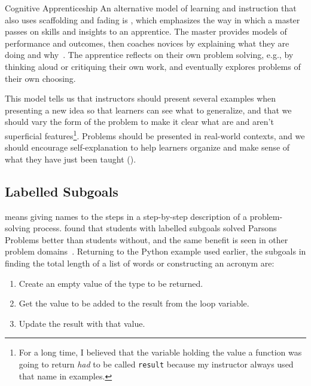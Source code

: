 \begin{aside}{Cognitive Apprenticeship}
  An alternative model of learning and instruction that also uses scaffolding and fading
  is ,
  which emphasizes the way in which a master passes on skills and insights to an apprentice.
  The master provides models of performance and outcomes,
  then coaches novices by explaining what they are doing and why~\cite{Coll1991,Casp2007}.
  The apprentice reflects on their own problem solving,
  e.g.,
  by thinking aloud or critiquing their own work,
  and eventually explores problems of their own choosing.

  This model tells us that
  instructors should present several examples when presenting a new idea
  so that learners can see what to generalize,
  and that we should vary the form of the problem to make it clear what are and aren't superficial features\footnote{For a long time,
    I believed that the variable holding the value a function was going to return \emph{had} to be called \texttt{result}
    because my instructor always used that name in examples.}.
  Problems should be presented in real-world contexts,
  and we should encourage self-explanation to help learners organize and make sense of what they have just been taught
  ().
\end{aside}

\subsection*{Labelled Subgoals}

 means
giving names to the steps in a step-by-step description of a problem-solving process.
\cite{Marg2016,Morr2016} found that students with labelled subgoals solved Parsons Problems better than students without,
and the same benefit is seen in other problem domains~\cite{Marg2012}.
Returning to the Python example used earlier,
the subgoals in finding the total length of a list of words or constructing an acronym are:

\begin{enumerate}

\item
  Create an empty value of the type to be returned.

\item
  Get the value to be added to the result from the loop variable.

\item
  Update the result with that value.

\end{enumerate}

